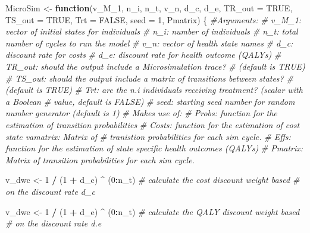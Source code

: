 \documentclass[
]{article}
\newenvironment{Shaded}{\begin{snugshade}}{\end{snugshade}}
\newcommand{\AttributeTok}[1]{\textcolor[rgb]{0.13,0.29,0.53}{#1}}
\newcommand{\CommentTok}[1]{\textcolor[rgb]{0.56,0.35,0.01}{\textit{#1}}}
\newcommand{\ConstantTok}[1]{\textcolor[rgb]{0.56,0.35,0.01}{#1}}
\newcommand{\ControlFlowTok}[1]{\textcolor[rgb]{0.13,0.29,0.53}{\textbf{#1}}}
\newcommand{\DecValTok}[1]{\textcolor[rgb]{0.00,0.00,0.81}{#1}}
\newcommand{\NormalTok}[1]{#1}
\newcommand{\OtherTok}[1]{\textcolor[rgb]{0.56,0.35,0.01}{#1}}
\newcommand{\SpecialCharTok}[1]{\textcolor[rgb]{0.81,0.36,0.00}{\textbf{#1}}}
\begin{document}
\begin{Shaded}
\begin{Highlighting}[]
\NormalTok{MicroSim }\OtherTok{\textless{}{-}} \ControlFlowTok{function}\NormalTok{(v\_M\_1, n\_i, n\_t, v\_n, d\_c, d\_e, }\AttributeTok{TR\_out =} \ConstantTok{TRUE}\NormalTok{, }
                     \AttributeTok{TS\_out =} \ConstantTok{TRUE}\NormalTok{, }\AttributeTok{Trt =} \ConstantTok{FALSE}\NormalTok{, }\AttributeTok{seed =} \DecValTok{1}\NormalTok{, Pmatrix) \{}
  \CommentTok{\#Arguments:}
  \CommentTok{\# v\_M\_1:   vector of initial states for individuals}
  \CommentTok{\# n\_i:     number of individuals}
  \CommentTok{\# n\_t:     total number of cycles to run the model}
  \CommentTok{\# v\_n:     vector of health state names}
  \CommentTok{\# d\_c:     discount rate for costs}
  \CommentTok{\# d\_e:     discount rate for health outcome (QALYs)}
  \CommentTok{\# TR\_out:  should the output include a Microsimulation trace? }
  \CommentTok{\#          (default is TRUE)}
  \CommentTok{\# TS\_out:  should the output include a matrix of transitions between states? }
  \CommentTok{\#          (default is TRUE)}
  \CommentTok{\# Trt:     are the n.i individuals receiving treatment? (scalar with a Boolean}
  \CommentTok{\#          value, default is FALSE)}
  \CommentTok{\# seed:    starting seed number for random number generator (default is 1)}
  \CommentTok{\# Makes use of:}
  \CommentTok{\# Probs:   function for the estimation of transition probabilities}
  \CommentTok{\# Costs:   function for the estimation of cost state vamatrix: Matrix of }
  \CommentTok{\# tranistion probabilities for each sim cycle.}
  \CommentTok{\# Effs:    function for the estimation of state specific health outcomes (QALYs)}
  \CommentTok{\# Pmatrix: Matrix of transition probabilities for each sim cycle.}
  
\NormalTok{  v\_dwc }\OtherTok{\textless{}{-}} \DecValTok{1} \SpecialCharTok{/}\NormalTok{ (}\DecValTok{1} \SpecialCharTok{+}\NormalTok{ d\_c) }\SpecialCharTok{\^{}}\NormalTok{ (}\DecValTok{0}\SpecialCharTok{:}\NormalTok{n\_t)   }\CommentTok{\# calculate the cost discount weight based}
  \CommentTok{\# on the discount rate d\_c }
  
\NormalTok{  v\_dwe }\OtherTok{\textless{}{-}} \DecValTok{1} \SpecialCharTok{/}\NormalTok{ (}\DecValTok{1} \SpecialCharTok{+}\NormalTok{ d\_e) }\SpecialCharTok{\^{}}\NormalTok{ (}\DecValTok{0}\SpecialCharTok{:}\NormalTok{n\_t)   }\CommentTok{\# calculate the QALY discount weight based }
  \CommentTok{\# on the discount rate d.e}
  

\end{Highlighting}
\end{Shaded}
\end{document}
